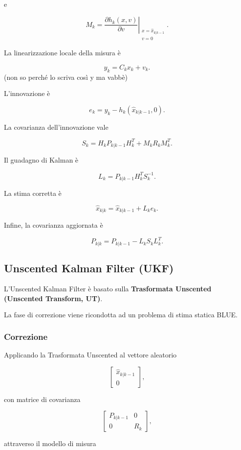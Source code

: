 \documentclass[11pt,a4paper]{article}
\begin{document}
e

\[
\boxed{
M_k
=
\left.
\frac{\partial h_k(x,v)}
{\partial v}
\right|_{
\substack{
x=\hat{x}_{k|k-1}\\
v=0
}
}.
}
\]

La linearizzazione locale della misura è

\[
y_k
=
C_k x_k + v_k.
\]
(non so perché lo scriva così y ma vabbè)

L'innovazione è

\[
\boxed{
e_k
=
y_k
-
h_k(\hat{x}_{k|k-1},0).
}
\]

La covarianza dell'innovazione vale

\[
\boxed{
S_k
=
H_kP_{k|k-1}H_k^T
+
M_kR_kM_k^T.
}
\]

Il guadagno di Kalman è

\[
\boxed{
L_k
=
P_{k|k-1}
H_k^T
S_k^{-1}.
}
\]

La stima corretta è

\[
\boxed{
\hat{x}_{k|k}
=
\hat{x}_{k|k-1}
+
L_ke_k.
}
\]

Infine, la covarianza aggiornata è

\[
\boxed{
P_{k|k}
=
P_{k|k-1}
-
L_kS_kL_k^T.
}
\]

\subsection*{Unscented Kalman Filter (UKF)}

L'Unscented Kalman Filter è basato sulla \textbf{Trasformata Unscented (Unscented Transform, UT)}.

La fase di correzione viene ricondotta ad un problema di stima statica BLUE.

\subsubsection*{Correzione}

Applicando la Trasformata Unscented al vettore aleatorio

\[
\begin{bmatrix}
\hat{x}_{k|k-1}\\
0
\end{bmatrix},
\]

con matrice di covarianza

\[
\begin{bmatrix}
P_{k|k-1} & 0\\
0 & R_k
\end{bmatrix},
\]

attraverso il modello di misura
\end{document}
